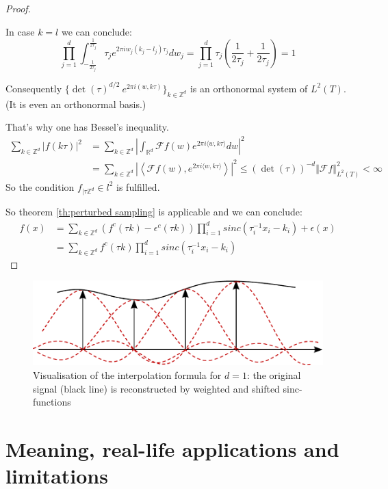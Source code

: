 \documentclass[a4paper, 11pt]{scrreprt}
\newcommand{\RR}{\mathbb{R}}
\newcommand{\ZZ}{\mathbb{Z}}
\newcommand{\FF}{\mathcal{F}}
\newcommand{\student}[1]{\marginnote{{\normalfont\bf #1}}}
\begin{document}
\begin{proof}[Proof]
\begin{itemize}
In case $k = l$ we can conclude:
\[\prod_{j=1}^d \int_{-\frac{1}{2\tau_j}}^{\frac{1}{2\tau_j}} \tau_j e^{2 \pi i w_j (k_j-l_j) \tau_j}dw_j
= \prod_{j=1}^d \tau_j \left(\frac{1}{2\tau_j}+\frac{1}{2\tau_j}\right) = 1\]

Consequently $\{\det(\tau)^{d/2}\ e^{2 \pi i (w,k \tau)}\}_{k \in \ZZ^d}$ is an orthonormal system of $L^2(T)$. (It is even an orthonormal basis.)

\student{Andreas}
That's why one has Bessel's inequality.
\begin{align*}
\sum_{k \in \ZZ^d} |f(k \tau)|^2
&= \sum_{k \in \ZZ^d} | \int_{\RR^d} \FF f(w) e^{2 \pi i \langle w,k \tau \rangle}dw|^2 \\
&= \sum_{k \in \ZZ^d} | \left\langle \FF f(w), e^{2 \pi i \langle w,k \tau \rangle}\right\rangle |^2
\leq (\det(\tau))^{-d} \Vert \FF f \Vert_{L^2(T)}^2 < \infty
\end{align*}
So the condition $f_{|\tau\ZZ^d} \in l^2$ is fulfilled.

\end{itemize}

So theorem \ref{th:perturbed sampling} is applicable and we can conclude:
\begin{align*}
f(x) &= \sum_{k\in\ZZ^d} (f^c(\tau k)-\epsilon^c(\tau k))\prod _{i=1}^d sinc(\tau_i^{-1}x_i-k_i)+\epsilon(x) \\
&= \sum_{k \in \ZZ^d} f^c(\tau k) \prod_{i=1}^d sinc\left(\tau_i^{-1} x_i -k_i\right)  
\end{align*}

\end{proof}
\begin{figure}[htpb]
	\centering
	\includegraphics[width=0.80 \textwidth]{Rekonstruktion-Visualisierung.pdf}
	\caption{Visualisation of the interpolation formula for \(d=1\): the original signal (black line) is reconstructed by weighted and shifted sinc-functions}
\end{figure}


\newpage
\section{Meaning, real-life applications and limitations}
\student{Manuela}
\end{document}
